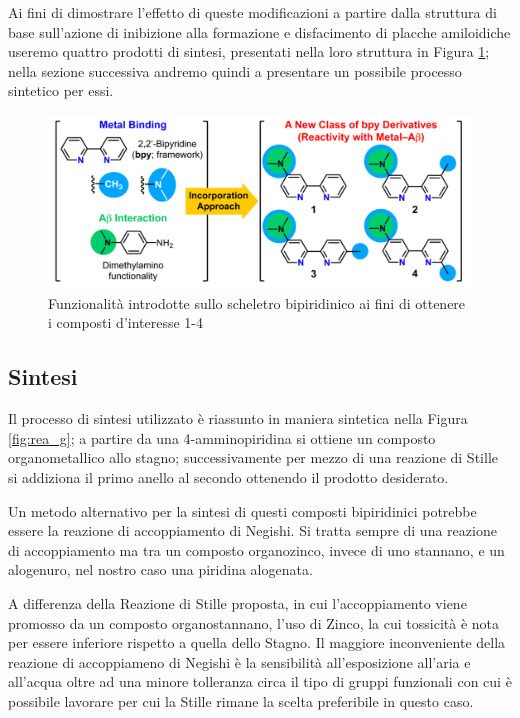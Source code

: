 \documentclass[a4paper, 12pt]{article}
\begin{document}
Ai fini di dimostrare l'effetto di queste modificazioni a partire dalla struttura di base sull'azione di inibizione alla formazione e disfacimento di placche amiloidiche useremo quattro prodotti di sintesi, presentati nella loro struttura in Figura \ref{fig:bpy_mod}; nella sezione successiva andremo quindi a presentare un possibile processo sintetico per essi.

\begin{figure}[H]
	\centering
	\includegraphics[width=\linewidth]{immagini/bpy_mod.png}
	\caption{Funzionalità introdotte sullo scheletro bipiridinico ai fini di ottenere i composti d'interesse 1-4}
	\label{fig:bpy_mod}
\end{figure}

\subsection{Sintesi}
\label{sec:bpy_stille}
Il processo di sintesi utilizzato è riassunto in maniera sintetica nella Figura \ref{fig:rea_g}; a partire da una 4-amminopiridina si ottiene un composto organometallico allo stagno; successivamente per mezzo di una reazione di Stille si addiziona il primo anello al secondo ottenendo il prodotto desiderato.

Un metodo alternativo per la sintesi di questi composti bipiridinici potrebbe essere la reazione di accoppiamento di Negishi. Si tratta sempre di una reazione di accoppiamento ma tra un composto organozinco, invece di uno stannano, e un alogenuro, nel nostro caso una piridina alogenata. \cite{clayden_organic_2012}

A differenza della Reazione di Stille proposta, in cui l'accoppiamento viene promosso da un composto organostannano, l'uso di Zinco, la cui tossicità è nota per essere inferiore rispetto a quella dello Stagno. Il maggiore inconveniente della reazione di accoppiameno di Negishi è la sensibilità all'esposizione all'aria e all'acqua oltre ad una minore tolleranza circa il tipo di gruppi funzionali con cui è possibile lavorare per cui la Stille rimane la scelta preferibile in questo caso. \cite{nicolaou_palladium-catalyzed_2005}
\end{document}

